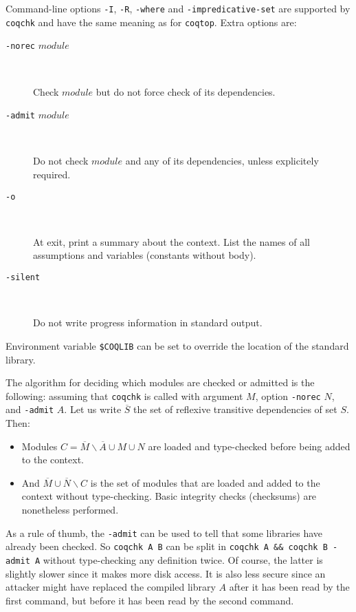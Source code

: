 Command-line options {\tt -I}, {\tt -R}, {\tt -where} and
{\tt -impredicative-set} are supported by {\tt coqchk} and have the
same meaning as for {\tt coqtop}. Extra options are:
\begin{description}
\item[{\tt -norec} $module$]\ 

  Check $module$ but do not force check of its dependencies.
\item[{\tt -admit} $module$] \

  Do not check $module$ and any of its dependencies, unless
  explicitely required.
\item[{\tt -o}]\ 

  At exit, print a summary about the context. List the names of all
  assumptions and variables (constants without body).
\item[{\tt -silent}]\ 

  Do not write progress information in standard output.
\end{description}

Environment variable \verb:$COQLIB: can be set to override the
location of the standard library.

The algorithm for deciding which modules are checked or admitted is
the following: assuming that {\tt coqchk} is called with argument $M$,
option {\tt -norec} $N$, and {\tt -admit} $A$. Let us write
$\overline{S}$ the set of reflexive transitive dependencies of set
$S$. Then:
\begin{itemize}
\item Modules $C=\overline{M}\backslash\overline{A}\cup M\cup N$ are
  loaded and type-checked before being added to the context.
\item And $\overline{M}\cup\overline{N}\backslash C$ is the set of
  modules that are loaded and added to the context without
  type-checking. Basic integrity checks (checksums) are nonetheless
  performed.
\end{itemize}

As a rule of thumb, the {\tt -admit} can be used to tell that some
libraries have already been checked. So {\tt coqchk A B} can be split
in {\tt coqchk A \&\& coqchk B -admit A} without type-checking any
definition twice. Of course, the latter is slightly slower since it
makes more disk access. It is also less secure since an attacker might
have replaced the compiled library $A$ after it has been read by the
first command, but before it has been read by the second command.


